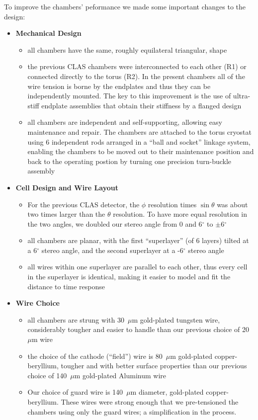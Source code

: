 To improve the chambers' peformance we made some important changes to the design:
\begin{itemize}
\item {\bf Mechanical Design}
\begin{itemize}
\item all chambers have the same, roughly equilateral triangular, shape
\item the previous CLAS chambers were interconnected to each other (R1) or 
connected directly to the torus (R2).  In the present chambers all of the wire tension
is borne by the endplates and thus they can be independently mounted.
The key to this improvement is the use of  
ultra-stiff endplate assemblies that obtain their stiffness 
by a flanged design
\item all chambers are independent and self-supporting, allowing easy
maintenance and repair.  The chambers are attached to the torus cryostat using 6 independent
rods arranged in a ``ball and socket'' linkage system, enabling the chambers to
be moved out to their maintenance position and back to the operating 
postion by turning one precision turn-buckle assembly
\end{itemize}
\item {\bf Cell Design and Wire Layout}
\begin{itemize}  
\item For the previous CLAS detector, the $\phi$ resolution times $\sin \theta$ was about two 
times larger than the $\theta$ resolution.  To have more equal resolution in 
the two angles, we doubled our stereo angle from 0 and 6$^\circ$ to 
$\pm$6$^\circ$
\item all chambers are planar, with the first ``superlayer'' (of 6 layers)
tilted at a 6$^\circ$ stereo angle, and the second superlayer at a -6$^\circ$ stereo angle
\item all wires within one superlayer are parallel to each other, thus
every cell in the superlayer is identical, making it easier to model
and fit the distance to time response
\end{itemize}
\item {\bf Wire Choice}
\begin{itemize}
\item all chambers are strung with 30~$\mu$m gold-plated tungsten wire,
considerably tougher and easier to handle than our previous choice 
of 20~$\mu$m wire \item the choice of the cathode (``field'') wire is 80~$\mu$m
gold-plated copper-beryllium, tougher and with better surface properties than our previous
choice of 140~$\mu$m gold-plated Aluminum wire
\item  Our choice of guard wire is 140~$\mu$m diameter, gold-plated
copper-beryllium.  These wires were strong enough that we pre-tensioned 
the chambers using only the guard wires; a simplification in the process.
\end{itemize}
\end{itemize}

